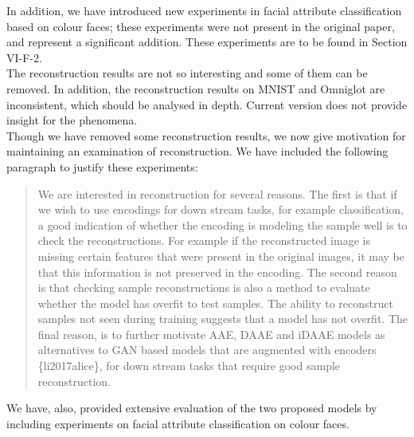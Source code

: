 \documentclass[a4paper,11pt]{article}
\begin{document}
In addition, we have introduced new experiments in facial attribute classification based on colour faces; these experiments were not present in the original paper, and represent a significant addition.  These experiments are to be found in {\color{red} Section VI-F-2}.\\

{\color{blue}
The reconstruction results are not so interesting and some of them can be removed. In addition, the reconstruction results on MNIST and Omniglot are inconsistent, which should be analysed in depth. Current version does not provide insight for the phenomena.}\\


Though we have removed some reconstruction results, we now give motivation for maintaining an examination of reconstruction. We have included the following paragraph to justify these experiments:

\begin{quote}
{\color{red} We are interested in reconstruction for several reasons. The first is that if we wish to use encodings for down stream tasks, for example classification, a good indication of whether the encoding is modeling the sample well is to check the reconstructions. For example if the reconstructed image is missing certain features that were present in the original images, it may be that this information is not preserved in the encoding. The second reason is that checking sample reconstructions is also a method to evaluate whether the model has overfit to test samples. The ability to reconstruct samples not seen during training suggests that a model has not overfit. The final reason, is to further motivate AAE, DAAE and iDAAE models as alternatives to GAN based models that are augmented with encoders \{li2017alice\}, for down stream tasks that require good sample reconstruction.}
\end{quote}

We have, also, provided extensive evaluation of the two proposed models by including experiments on facial attribute classification on colour faces. \\
\end{document}
